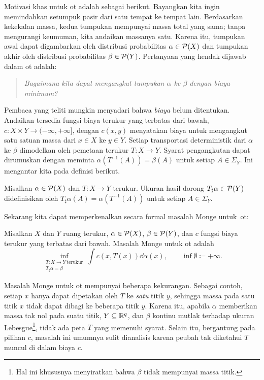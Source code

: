 Motivasi khas untuk \gls{ot} adalah sebagai berikut. Bayangkan kita ingin memindahkan setumpuk pasir dari satu tempat ke tempat lain. Berdasarkan kekekalan massa, kedua tumpukan mempunyai massa total yang sama; tanpa mengurangi keumuman, kita andaikan massanya satu. Karena itu, tumpukan awal dapat digambarkan oleh distribusi probabilitas $\alpha\in\mathcal{P}(X)$ dan tumpukan akhir oleh distribusi probabilitas $\beta\in\mathcal{P}(Y)$. Pertanyaan yang hendak dijawab dalam \gls{ot} adalah:
\begin{quote}
    \centering
    \emph{Bagaimana kita dapat mengangkut tumpukan $\alpha$ ke $\beta$ dengan biaya minimum?}
\end{quote}
Pembaca yang teliti mungkin menyadari bahwa \emph{biaya} belum ditentukan. Andaikan tersedia fungsi biaya terukur yang terbatas dari bawah, $c:X\times Y\rightarrow(-\infty,+\infty]$, dengan $c(x,y)$ menyatakan biaya untuk mengangkut satu satuan massa dari $x\in X$ ke $y\in Y$. Setiap transportasi deterministik dari $\alpha$ ke $\beta$ dimodelkan oleh pemetaan terukur $T:X\rightarrow Y$. Syarat pengangkutan dapat dirumuskan dengan meminta $\alpha(T^{-1}(A))=\beta(A)$ untuk setiap $A\in\Sigma_Y$. Ini mengantar kita pada definisi berikut.
\begin{defn}
    Misalkan $\alpha\in\mathcal{P}(X)$ dan $T:X\rightarrow Y$ terukur. Ukuran hasil dorong $T_\sharp\alpha\in\mathcal{P}(Y)$ didefinisikan oleh $T_\sharp\alpha(A)=\alpha(T^{-1}(A))$ untuk setiap $A\in\Sigma_Y$.
\end{defn}

Sekarang kita dapat memperkenalkan secara formal masalah Monge untuk~\gls{ot}:
\begin{defn}
    Misalkan $X$ dan $Y$ ruang terukur, $\alpha\in\mathcal{P}(X)$, $\beta\in\mathcal{P}(Y)$, dan $c$ fungsi biaya terukur yang terbatas dari bawah. Masalah Monge untuk \gls{ot} adalah
    \begin{equation}\label{ot:eq:monge}
        \inf_{\substack{T:X\rightarrow Y\ \mathrm{terukur}\\T_\sharp\alpha=\beta}}
        \int c(x,T(x))\dd\alpha(x),
        \qquad \inf\emptyset\coloneqq+\infty.
    \end{equation}
\end{defn}
Masalah Monge untuk \gls{ot} mempunyai beberapa kekurangan. Sebagai contoh, setiap $x$ hanya dapat dipetakan oleh $T$ ke \emph{satu} titik $y$, sehingga massa pada satu titik $x$ tidak dapat dibagi ke beberapa titik $y$. Karena itu, apabila $\alpha$ memberikan massa tak nol pada suatu titik, $Y\subseteq\mathbb{R}^q$, dan $\beta$ kontinu mutlak terhadap ukuran Lebesgue\footnote{Hal ini khususnya menyiratkan bahwa $\beta$ tidak mempunyai massa titik.}, tidak ada peta $T$ yang memenuhi syarat. Selain itu, bergantung pada pilihan $c$, masalah ini umumnya sulit dianalisis karena peubah tak diketahui $T$ muncul di dalam biaya $c$.

